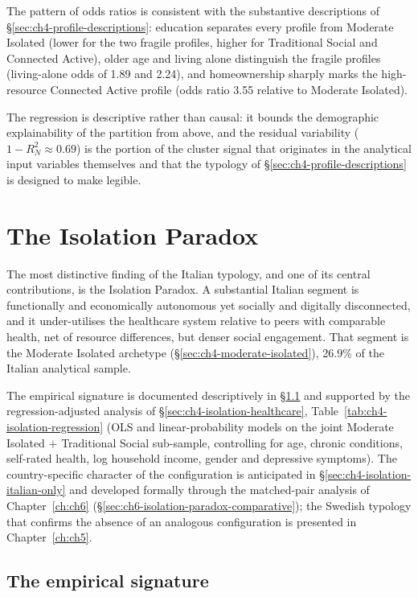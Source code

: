 The pattern of odds ratios is consistent with the substantive descriptions of \S\ref{sec:ch4-profile-descriptions}: education separates every profile from Moderate Isolated (lower for the two fragile profiles, higher for Traditional Social and Connected Active), older age and living alone distinguish the fragile profiles (living-alone odds of 1.89 and 2.24), and homeownership sharply marks the high-resource Connected Active profile (odds ratio 3.55 relative to Moderate Isolated).

The regression is descriptive rather than causal: it bounds the demographic explainability of the partition from above, and the residual variability ($1 - R^{2}_{N} \approx 0.69$) is the portion of the cluster signal that originates in the analytical input variables themselves and that the typology of \S\ref{sec:ch4-profile-descriptions} is designed to make legible.

\section{The Isolation Paradox}
\label{sec:ch4-isolation-paradox}

The most distinctive finding of the Italian typology, and one of its central contributions, is the Isolation Paradox. A substantial Italian segment is functionally and economically autonomous yet socially and digitally disconnected, and it under-utilises the healthcare system relative to peers with comparable health, net of resource differences, but denser social engagement. That segment is the Moderate Isolated archetype (\S\ref{sec:ch4-moderate-isolated}), 26.9\% of the Italian analytical sample.

The empirical signature is documented descriptively in \S\ref{sec:ch4-isolation-empirical} and supported by the regression-adjusted analysis of \S\ref{sec:ch4-isolation-healthcare}, Table~\ref{tab:ch4-isolation-regression} (OLS and linear-probability models on the joint Moderate Isolated $+$ Traditional Social sub-sample, controlling for age, chronic conditions, self-rated health, log household income, gender and depressive symptoms). The country-specific character of the configuration is anticipated in \S\ref{sec:ch4-isolation-italian-only} and developed formally through the matched-pair analysis of Chapter~\ref{ch:ch6} (\S\ref{sec:ch6-isolation-paradox-comparative}); the Swedish typology that confirms the absence of an analogous configuration is presented in Chapter~\ref{ch:ch5}.

\subsection{The empirical signature}
\label{sec:ch4-isolation-empirical}

